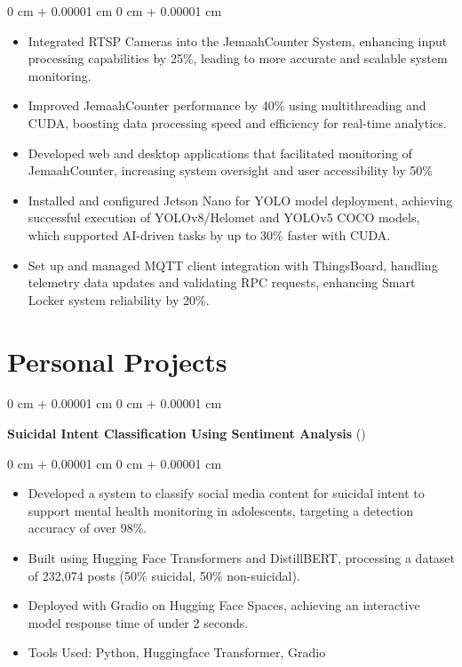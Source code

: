 \documentclass[10pt, letterpaper]{article}
\newenvironment{highlights}{
    \begin{itemize}[
        topsep=0.10 cm,
        parsep=0.10 cm,
        partopsep=0pt,
        itemsep=0pt,
        leftmargin=0 cm + 10pt
    ]
}{
    \end{itemize}
} %
\newenvironment{onecolentry}{
    \begin{adjustwidth}{
        0 cm + 0.00001 cm
    }{
        0 cm + 0.00001 cm
    }
}{
    \end{adjustwidth}
} %
\newenvironment{twocolentry}[2][]{
    \onecolentry
    \def\secondColumn{#2}
    \setcolumnwidth{\fill, 4.5 cm}
    \begin{paracol}{2}
}{
    \switchcolumn \raggedleft \secondColumn
    \end{paracol}
    \endonecolentry
} %
\let\hrefWithoutArrow\href
\renewcommand{\href}[2]{\hrefWithoutArrow{#1}{\ifthenelse{\equal{#2}{}}{ }{#2 }\raisebox{.15ex}{\footnotesize \faExternalLink*}}}
\begin{document}
        \vspace{0.10 cm}
        \begin{onecolentry}
            \begin{highlights}
                \item Integrated RTSP Cameras into the JemaahCounter System, enhancing input processing capabilities by 25\%, leading to more accurate and scalable system monitoring.
                \item Improved JemaahCounter performance by 40\% using multithreading and CUDA, boosting data processing speed and efficiency for real-time analytics.
                \item Developed web and desktop applications that facilitated monitoring of JemaahCounter, increasing system oversight and user accessibility by 50\%
                \item Installed and configured Jetson Nano for YOLO model deployment, achieving successful execution of YOLOv8/Helomet and YOLOv5 COCO models, which supported AI-driven tasks by up to 30\% faster with CUDA.
                \item Set up and managed MQTT client integration with ThingsBoard, handling telemetry data updates and validating RPC requests, enhancing Smart Locker system reliability by 20\%.
            \end{highlights}
        \end{onecolentry}



    
    \section{Personal Projects}



        
        \begin{twocolentry}{
            (\href{https://github.com/pradanaadn/sucidal-text-classification}{Project Link})
        }
            \textbf{Suicidal Intent Classification Using Sentiment Analysis}\end{twocolentry}

        \vspace{0.10 cm}
        \begin{onecolentry}
            \begin{highlights}
                \item Developed a system to classify social media content for suicidal intent to support mental health monitoring in adolescents, targeting a detection accuracy of over 98\%.
                \item Built using Hugging Face Transformers and DistillBERT, processing a dataset of 232,074 posts (50\% suicidal, 50\% non-suicidal).
                \item Deployed with Gradio on Hugging Face Spaces, achieving an interactive model response time of under 2 seconds.
                \item Tools Used: Python, Huggingface Transformer, Gradio
            \end{highlights}
        \end{onecolentry}
\end{document}
